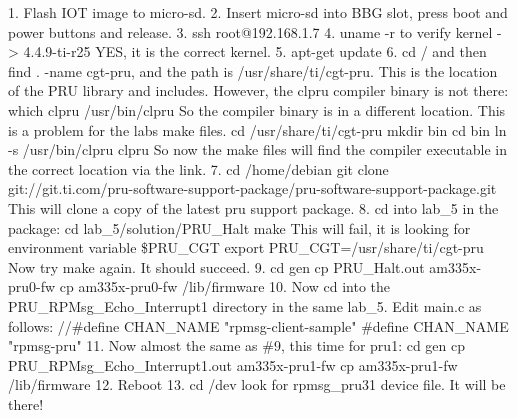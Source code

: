 1.  Flash IOT image to micro-sd.
2.  Insert micro-sd into BBG slot, press boot and power buttons and release.
3.  ssh root@192.168.1.7
4.  uname -r to verify kernel -> 4.4.9-ti-r25  YES, it is the correct kernel.
5.  apt-get update
6.  cd / and then find . -name cgt-pru, and the path is /usr/share/ti/cgt-pru.  This is the location of the PRU library and includes.
However, the clpru compiler binary is not there:
which clpru
/usr/bin/clpru
So the compiler binary is in a different location.  This is a problem for the labs make files.
cd /usr/share/ti/cgt-pru
mkdir bin
cd bin
ln -s /usr/bin/clpru clpru
So now the make files will find the compiler executable in the correct location via the link.
7.  cd /home/debian
git clone git://git.ti.com/pru-software-support-package/pru-software-support-package.git
This will clone a copy of the latest pru support package.
8.  cd into lab\_5 in the package:
cd lab\_5/solution/PRU\_Halt
make
This will fail, it is looking for environment variable \$PRU\_CGT
export PRU\_CGT=/usr/share/ti/cgt-pru
Now try make again.  It should succeed.
9.  cd gen
cp PRU\_Halt.out am335x-pru0-fw
cp am335x-pru0-fw /lib/firmware
10.  Now cd into the PRU\_RPMsg\_Echo\_Interrupt1 directory in the same lab\_5.
Edit main.c as follows:
//\#define CHAN\_NAME					"rpmsg-client-sample"
\#define CHAN\_NAME					"rpmsg-pru"
11.  Now almost the same as \#9, this time for pru1:
cd gen
cp PRU\_RPMsg\_Echo\_Interrupt1.out am335x-pru1-fw
cp am335x-pru1-fw /lib/firmware
12.  Reboot
13.  cd /dev look for rpmsg\_pru31 device file.  It will be there!




